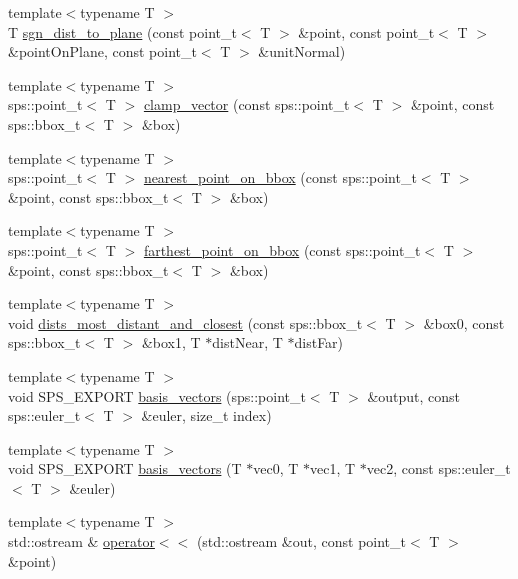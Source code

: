 \begin{DoxyCompactItemize}
\item 
{\footnotesize template$<$typename T $>$ }\\T \hyperlink{namespacesps_a6d00662f3287276d877ae3e1e10b9c6e}{sgn\+\_\+dist\+\_\+to\+\_\+plane} (const point\+\_\+t$<$ T $>$ \&point, const point\+\_\+t$<$ T $>$ \&point\+On\+Plane, const point\+\_\+t$<$ T $>$ \&unit\+Normal)
\item 
{\footnotesize template$<$typename T $>$ }\\sps\+::point\+\_\+t$<$ T $>$ \hyperlink{namespacesps_a4cbe6332a0c07b3bb2e80bb8048d6f9e}{clamp\+\_\+vector} (const sps\+::point\+\_\+t$<$ T $>$ \&point, const sps\+::bbox\+\_\+t$<$ T $>$ \&box)
\item 
{\footnotesize template$<$typename T $>$ }\\sps\+::point\+\_\+t$<$ T $>$ \hyperlink{namespacesps_a49f2545f74f9a6cf30e04d428badaf27}{nearest\+\_\+point\+\_\+on\+\_\+bbox} (const sps\+::point\+\_\+t$<$ T $>$ \&point, const sps\+::bbox\+\_\+t$<$ T $>$ \&box)
\item 
{\footnotesize template$<$typename T $>$ }\\sps\+::point\+\_\+t$<$ T $>$ \hyperlink{namespacesps_a5ba962916e1ba5c3114e45f153d80081}{farthest\+\_\+point\+\_\+on\+\_\+bbox} (const sps\+::point\+\_\+t$<$ T $>$ \&point, const sps\+::bbox\+\_\+t$<$ T $>$ \&box)
\item 
{\footnotesize template$<$typename T $>$ }\\void \hyperlink{namespacesps_a00bcbe34e177c2a5ac0ec59f89998db2}{dists\+\_\+most\+\_\+distant\+\_\+and\+\_\+closest} (const sps\+::bbox\+\_\+t$<$ T $>$ \&box0, const sps\+::bbox\+\_\+t$<$ T $>$ \&box1, T $\ast$dist\+Near, T $\ast$dist\+Far)
\item 
{\footnotesize template$<$typename T $>$ }\\void S\+P\+S\+\_\+\+E\+X\+P\+O\+R\+T \hyperlink{namespacesps_af6fa4d5ae05cae25226c8f79d864a722}{basis\+\_\+vectors} (sps\+::point\+\_\+t$<$ T $>$ \&output, const sps\+::euler\+\_\+t$<$ T $>$ \&euler, size\+\_\+t index)
\item 
{\footnotesize template$<$typename T $>$ }\\void S\+P\+S\+\_\+\+E\+X\+P\+O\+R\+T \hyperlink{namespacesps_a1f2f198c4ef4cd43756c6d07dfcbd790}{basis\+\_\+vectors} (T $\ast$vec0, T $\ast$vec1, T $\ast$vec2, const sps\+::euler\+\_\+t$<$ T $>$ \&euler)
\item 
{\footnotesize template$<$typename T $>$ }\\std\+::ostream \& \hyperlink{namespacesps_a1f6bfb41fd1c17ffbe559cb6c9838487}{operator$<$$<$} (std\+::ostream \&out, const point\+\_\+t$<$ T $>$ \&point)
\end{DoxyCompactItemize}


